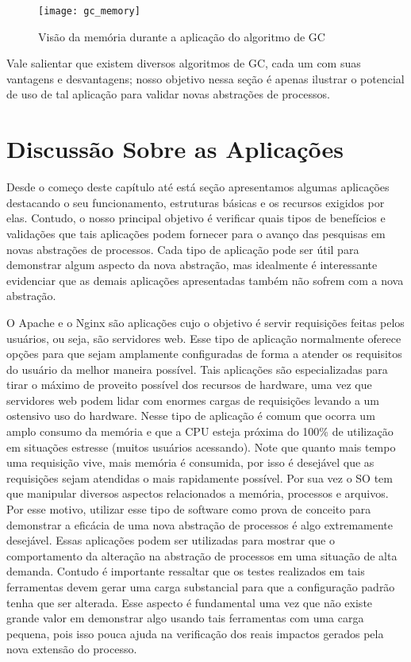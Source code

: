 \begin{figure}[!h]
  \centering
  \texttt{[image: gc\_memory]}
  \caption{Visão da memória durante a aplicação do algoritmo de GC\citep{gc_basics}}
  \label{fig:gc_mem}
\end{figure}

Vale salientar que existem diversos algoritmos de GC, cada um com suas
vantagens e desvantagens; nosso objetivo nessa seção é apenas ilustrar o
potencial de uso de tal aplicação para validar novas abstrações de processos.

\section{Discussão Sobre as Aplicações}
\label{sec:disc_app}

Desde o começo deste capítulo até está seção apresentamos algumas aplicações
destacando o seu funcionamento, estruturas básicas e os recursos exigidos por
elas. Contudo, o nosso principal objetivo é verificar quais tipos de benefícios
e validações que tais aplicações podem fornecer para o avanço das pesquisas em
novas abstrações de processos. Cada tipo de aplicação pode ser útil para
demonstrar algum aspecto da nova abstração, mas idealmente é interessante
evidenciar que as demais aplicações apresentadas também não sofrem com a nova
abstração.

O Apache e o Nginx são aplicações cujo o objetivo é servir requisições feitas
pelos usuários, ou seja, são servidores web. Esse tipo de aplicação normalmente
oferece opções para que sejam amplamente configuradas de forma a atender os
requisitos do usuário da melhor maneira possível. Tais aplicações são
especializadas para tirar o máximo de proveito possível dos recursos de hardware,
uma vez que servidores web podem lidar com enormes cargas de requisições
levando a um ostensivo uso do hardware. Nesse tipo de aplicação é comum que
ocorra um amplo consumo da memória e que a CPU esteja próxima do 100\% de
utilização em situações estresse (muitos usuários acessando).  Note que quanto
mais tempo uma requisição vive, mais memória é consumida, por isso é desejável
que as requisições sejam atendidas o mais rapidamente possível. Por sua vez o
SO tem que manipular diversos aspectos relacionados a memória, processos e
arquivos. Por esse motivo, utilizar esse tipo de software como prova de
conceito para demonstrar a eficácia de uma nova abstração de processos é algo
extremamente desejável. Essas aplicações podem ser utilizadas para mostrar que
o comportamento da alteração na abstração de processos em uma situação de alta
demanda. Contudo é importante ressaltar que os testes realizados em tais
ferramentas devem gerar uma carga substancial para que a configuração padrão
tenha que ser alterada. Esse aspecto é fundamental uma vez que não existe
grande valor em demonstrar algo usando tais ferramentas com uma carga pequena,
pois isso pouca ajuda na verificação dos reais impactos gerados pela nova
extensão do processo.

